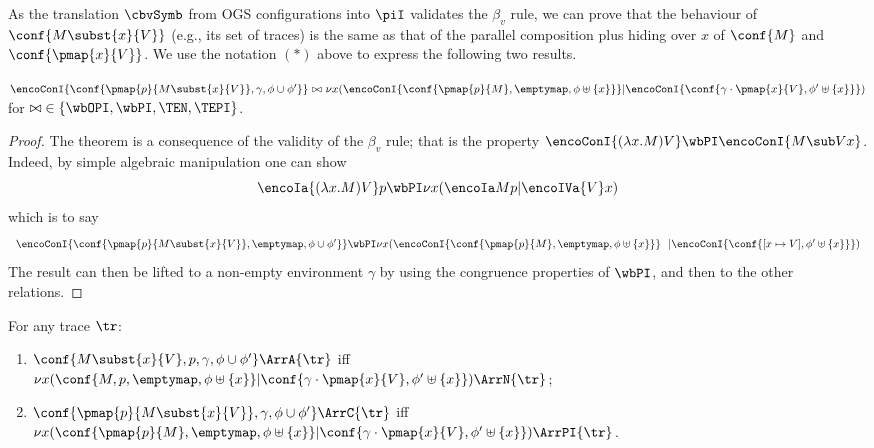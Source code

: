 
As the translation $\cbvSymb$ from OGS configurations into
 $\piI$
 validates the  $\beta_v$ rule, we can prove  that the behaviour of 
 $\conf{M\subst{x}{V}}$
(e.g., its set of traces)
is the same as that of the parallel composition plus hiding over $x$
of $\conf{M}$ and $\conf{\pmap{x}{V}}$.
We use the notation $(*)$  above to express the following two results. 

\begin{theorem} %
$
  \encoConI{\conf{\pmap{p}{M\subst{x}{V}},\gamma,\phi\cup\phi'}} 
\ {\bowtie}\
 \nu x(
  \encoConI{\conf{\pmap{p}{M},\emptymap,\phi \uplus \{x\}}}
     | \encoConI{\conf{\gamma \cdot\pmap{x}{V},\phi' \uplus \{x\}}})
$
for $ \bowtie \;  \in \{ \wbOPI, \wbPI, \TEN,\TEPI\}$. 
 \end{theorem}  

\begin{proof}
The theorem is a  consequence of the validity of the $\beta_v$ rule; that
is the property $  \encoConI{ (\lambda x. M) V }  \wbPI   \encoConI{  M \sub V x }  $. 
Indeed, by simple algebraic manipulation one can show 
$$   \encoIa{(\lambda x. M) V} p 
 \wbPI  \nu x( \encoIa M p |   \encoIVa {V} x)$$
which is to say
$$ 
\begin{array}{lc}
  \encoConI{\conf{\pmap{p}{M\subst{x}{V}},\emptymap ,\phi\cup\phi'}} 
 \wbPI
 \nu x(
   \encoConI{\conf{\pmap{p}{M},\emptymap,\phi \uplus \{x\}}} 
     \ \ | \encoConI{\conf{[x \mapsto V],\phi' \uplus \{x\}}})
\end{array} 
$$
The result can then be lifted to a  non-empty environment $ \gamma $ by using the congruence
properties of $\wbPI$, and then to the other relations.
\end{proof}

\begin{corollary}
For any trace $\tr$:
 \begin{enumerate}
 \item  $\conf{M\subst{x}{V},p,\gamma,\phi\cup\phi'} \ArrA{\tr}$
 iff $\nu x(
   \conf{M,p,\emptymap,\phi \uplus \{x\}}
      | \conf{\gamma \cdot\pmap{x}{V},\phi' \uplus \{x\}}) \ArrN{\tr}$;
 \item $\conf{\pmap{p}{M\subst{x}{V}},\gamma,\phi\cup\phi'} \ArrC{\tr}$
 iff $\nu x(
   \conf{\pmap{p}{M},\emptymap,\phi \uplus \{x\}}
      | \conf{\gamma \cdot\pmap{x}{V},\phi' \uplus \{x\}}) \ArrPI{\tr}$.
\end{enumerate}
\end{corollary}

